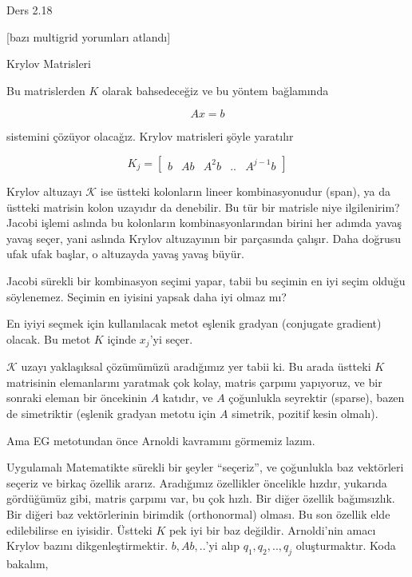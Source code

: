 \documentclass[12pt,fleqn]{article}\usepackage{../../common}
\begin{document}
Ders 2.18

[bazı multigrid yorumları atlandı]

Krylov Matrisleri 

Bu matrislerden $K$ olarak bahsedeceğiz ve bu yöntem bağlamında 

$$ Ax = b $$

sistemini çözüyor olacağız. Krylov matrisleri şöyle yaratılır

$$ K_j = \left[\begin{array}{rrrrr}
b & Ab & A^2b & .. & A^{j-1}b
\end{array}\right] $$

Krylov altuzayı $\mathscr{K}$ ise üstteki kolonların lineer kombinasyonudur
(span), ya da üstteki matrisin kolon uzayıdır da denebilir. Bu tür bir
matrisle niye ilgilenirim? Jacobi işlemi aslında bu kolonların
kombinasyonlarından birini her adımda yavaş yavaş seçer, yani aslında
Krylov altuzayının bir parçasında çalışır. Daha doğrusu ufak ufak başlar, o
altuzayda yavaş yavaş büyür.

Jacobi sürekli bir kombinasyon seçimi yapar, tabii bu seçimin en iyi seçim
olduğu söylenemez. Seçimin en iyisini yapsak daha iyi olmaz mı? 

En iyiyi seçmek için kullanılacak metot eşlenik gradyan (conjugate
gradient) olacak. Bu metot $K$ içinde $x_j$'yi seçer. 

$\mathscr{K}$ uzayı yaklaşıksal çözümümüzü aradığımız yer tabii ki. Bu arada üstteki
$K$ matrisinin elemanlarını yaratmak çok kolay, matris çarpımı yapıyoruz, ve
bir sonraki eleman bir öncekinin $A$ katıdır, ve $A$ çoğunlukla seyrektir
(sparse), bazen de simetriktir (eşlenik gradyan metotu için $A$ simetrik,
pozitif kesin olmalı).

Ama EG metotundan önce Arnoldi kavramını görmemiz lazım. 

Uygulamalı Matematikte sürekli bir şeyler ``seçeriz'', ve çoğunlukla baz
vektörleri seçeriz ve birkaç özellik ararız. Aradığımız özellikler
öncelikle hızdır, yukarıda gördüğümüz gibi, matris çarpımı var, bu çok
hızlı. Bir diğer özellik bağımsızlık. Bir diğeri baz vektörlerinin birimdik
(orthonormal) olması. Bu son özellik elde edilebilirse en iyisidir. Üstteki
$K$ pek iyi bir baz değildir. Arnoldi'nin amacı Krylov bazını
dikgenleştirmektir. $b,Ab,..$'yi alıp $q_1,q_2,..,q_j$ oluşturmaktır. Koda
bakalım,
\end{document}
